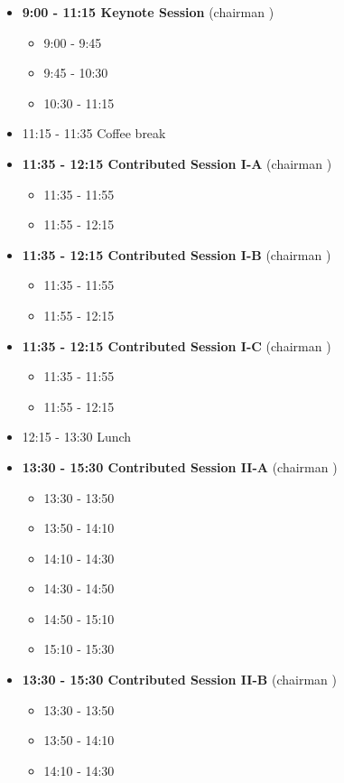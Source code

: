 \documentclass[10pt, A4]{article}%
\begin{document}
\begin{itemize}    
  \item {\bf 9:00 - 11:15 Keynote Session} (chairman ) 
  \begin{itemize}
    \item 9:00 - 9:45
    \item 9:45 - 10:30 
    \item 10:30 - 11:15
  \end{itemize}
  \item 11:15 - 11:35 Coffee break
  \item {\bf 11:35 - 12:15 Contributed Session I-A}  (chairman )
  \begin{itemize}
    \item 11:35 - 11:55 
    \item 11:55 - 12:15 
  \end{itemize}
  \item {\bf 11:35 - 12:15 Contributed Session I-B}  (chairman )
  \begin{itemize}
    \item 11:35 - 11:55 
    \item 11:55 - 12:15 
  \end{itemize}
    \item {\bf 11:35 - 12:15 Contributed Session I-C}  (chairman )
  \begin{itemize}
    \item 11:35 - 11:55 
    \item 11:55 - 12:15 
  \end{itemize}
      \item 12:15 - 13:30 Lunch
  \item {\bf 13:30 - 15:30 Contributed Session II-A} (chairman ) 
  \begin{itemize}
    \item 13:30 - 13:50 
    \item 13:50 - 14:10 
    \item 14:10 - 14:30 
    \item 14:30 - 14:50 
    \item 14:50 - 15:10 
    \item 15:10 - 15:30 
  \end{itemize}
  \item {\bf 13:30 - 15:30 Contributed Session II-B} (chairman ) 
  \begin{itemize}
    \item 13:30 - 13:50 
    \item 13:50 - 14:10 
    \item 14:10 - 14:30 

\end{itemize}
\end{itemize}
\end{document}
